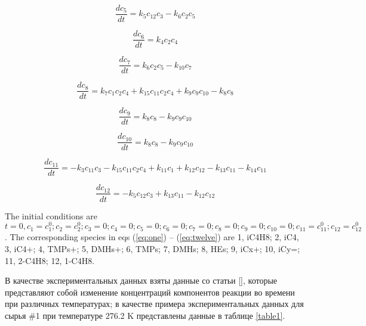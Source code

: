 \documentclass{svproc}
\begin{document}
\begin{equation}
  \frac{dc_5}{dt} = k_5c_{12}c_3 - k_{6}c_2c_5
  \label{eq:five}
\end{equation}

\begin{equation}
  \frac{dc_6}{dt} = k_4c_{2}c_4
  \label{eq:six}
\end{equation}

\begin{equation}
  \frac{dc_7}{dt} = k_6c_{2}c_5 - k_{10}c_7
  \label{eq:seven}
\end{equation}

\begin{equation}
  \frac{dc_8}{dt} = k_7c_{1}c_2c_4 + k_{15}c_{11}c_2c_4 + k_9c_9c_{10} - k_8c_8
  \label{eq:eight}
\end{equation}

\begin{equation}
  \frac{dc_9}{dt} = k_8c_{8} - k_{9}c_{9}c_{10}
  \label{eq:nine}
\end{equation}

\begin{equation}
  \frac{dc_{10}}{dt} = k_8c_{8} - k_{9}c_{9}c_{10}
  \label{eq:ten}
\end{equation}

\begin{equation}
  \frac{dc_{11}}{dt} = -k_3c_{11}c_3 - k_{15}c_{11}c_{2}c_4 + k_{11}c_1 + k_{12}c_{12} - k_{13}c_{11} - k_{14}c_{11}
  \label{eq:eleven}
\end{equation}

\begin{equation}
  \frac{dc_{12}}{dt} = -k_5c_{12}c_3 + k_{13}c_{11} - k_{12}c_{12}
  \label{eq:twelve}
\end{equation}

The initial conditions are $t = 0, c_1 = c_1^0; c_2=c_2^0; c_3 = 0; c_4 = 0; c_5= 0; c_6 = 0; c_7 = 0; c_8 = 0; c_9 = 0; c_{10} = 0; c_{11}=c_{11}^0; c_{12} = c_{12}^0$.
The corresponding species in eqs (\ref{eq:one}) -- (\ref{eq:twelve}) are 1, iC4H8; 2, iC4, 3, iC4+; 4, TMPs+; 5, DMHs+; 6, TMPs; 7, DMHs; 8, HEs; 9, iCx+; 10, iCy=; 11, 2-C4H8; 12, 1-C4H8.

В качестве экспериментальных данных взяты данные со статьи [], которые представляют собой изменение концентраций компонентов реакции во времени при различных температурах; в качестве примера экспериментальных данных для сырья \#1 при температуре 276.2 K представлены данные в таблице \ref{table1}.
\end{document}
